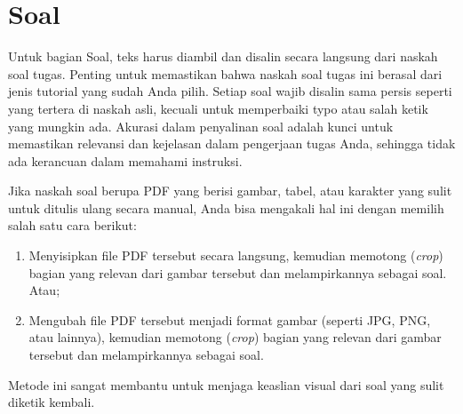 \chapter{Soal}


Untuk bagian Soal, teks harus diambil dan disalin secara langsung dari naskah soal tugas. Penting untuk memastikan bahwa naskah soal tugas ini berasal dari jenis tutorial yang sudah Anda pilih. Setiap soal wajib disalin sama persis seperti yang tertera di naskah asli, kecuali untuk memperbaiki typo atau salah ketik yang mungkin ada. Akurasi dalam penyalinan soal adalah kunci untuk memastikan relevansi dan kejelasan dalam pengerjaan tugas Anda, sehingga tidak ada kerancuan dalam memahami instruksi.

Jika naskah soal berupa PDF yang berisi gambar, tabel, atau karakter yang sulit untuk ditulis ulang secara manual, Anda bisa mengakali hal ini dengan memilih salah satu cara berikut: 

\begin{enumerate}
    \item Menyisipkan file PDF tersebut secara langsung, kemudian memotong (\textit{crop}) bagian yang relevan dari gambar tersebut dan melampirkannya sebagai soal. Atau;
    \item Mengubah file PDF tersebut menjadi format gambar (seperti JPG, PNG, atau lainnya), kemudian memotong (\textit{crop}) bagian yang relevan dari gambar tersebut dan melampirkannya sebagai soal.
\end{enumerate}

Metode ini sangat membantu untuk menjaga keaslian visual dari soal yang sulit diketik kembali.